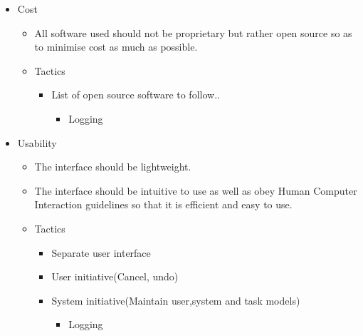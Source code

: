 \documentclass[a4paper,12pt]{article}
\begin{document}
\begin{itemize}
\begin{itemize}
			
		\end{itemize}
		\item Cost
		\begin{itemize}
			\item All software used should not be proprietary but rather open source so as to minimise cost as much as possible.
			
			\item Tactics
			\begin{itemize}
				\item List of open source software to follow..
					\begin{itemize}
						\item Logging
					\end{itemize}
			\end{itemize}			
			
		\end{itemize}
		\item Usability
		\begin{itemize}
			\item The interface should be lightweight.
			\item The interface should be intuitive to use as well as obey Human Computer Interaction guidelines so that it is efficient and easy to use.
			
			\item Tactics
			\begin{itemize}
				\item Separate user interface
				\item User initiative(Cancel, undo)
				\item System initiative(Maintain user,system and task models)
					\begin{itemize}
						\item Logging
					\end{itemize}
			\end{itemize}			
			
		\end{itemize}
	\end{itemize}
\end{document}
